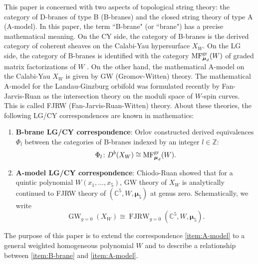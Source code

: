 \documentclass[11pt]{amsart}
\theoremstyle{definition} %
\theoremstyle{remark} %
\newcommand{\CC}{\mathbb C}
\newcommand{\ZZ}{\mathbb Z}
\def\MFhom{\operatorname{{MF}}}
\def\GW{\operatorname{\text{GW}}}
\newcommand{\bmu}{\boldsymbol{\mu}}
\newcommand{\FJRW}{{\operatorname{FJRW}}}
\renewcommand{\GW}{{\operatorname{GW}}}
\begin{document}
This paper is concerned with two aspects 
of topological string theory: 
the category of D-branes of type B (B-branes) and 
the closed string theory of type A (A-model). 
In this paper, the term ``B-brane" (or ``brane") 
has a precise mathematical meaning. 
On the CY side, the category of B-branes 
is the derived category of coherent sheaves on 
the Calabi-Yau hypersurface $X_W$. 
On the LG side, the category of B-branes 
is identified with the category 
$\MFhom^{\rm gr}_{\bmu_d}(W)$ 
of graded matrix factorizations of $W$ 
\cite{Orlov:cat-sing,Walcher, Hori-Walcher:F-term}. 
On the other hand, the mathematical A-model 
on the Calabi-Yau $X_W$ is given by GW (Gromov-Witten) theory. 
The mathematical A-model for the Landau-Ginzburg orbifold 
was formulated recently by Fan-Jarvis-Ruan \cite{FJR1} 
as the intersection theory on the moduli space 
of $W$-spin curves. 
This is called FJRW (Fan-Jarvis-Ruan-Witten) theory. 
About these theories, 
the following LG/CY correspondences  
are known in mathematics: 
\begin{enumerate} 
\item 
\label{item:B-brane} 
\textbf{B-brane LG/CY correspondence}: 
Orlov \cite{Orlov:equivalence} constructed derived equivalences 
$\Phi_l$ between the categories of B-branes 
indexed by an integer $l\in\ZZ$: 
\[
\Phi_l \colon D^b(X_W) \cong \MFhom^{\rm gr}_{\bmu_d}(W). 
\]

\item 
\label{item:A-model} 
\textbf{A-model LG/CY correspondence}:  
Chiodo-Ruan \cite{ChiRquintic} showed that 
for a quintic polynomial $W(x_1,\dots,x_5)$, 
GW theory of $X_W$ is analytically continued 
to FJRW theory of $(\CC^5, W,\bmu_5)$ at genus zero. 
Schematically, we write 
\[
\GW_{g=0}(X_W) \cong \FJRW_{g=0}(\CC^5,W,\bmu_5). 
\]
\end{enumerate} 
The purpose of this paper is to extend 
the correspondence \eqref{item:A-model} 
to a general weighted homogeneous polynomial $W$ 
and to describe a relationship between 
\eqref{item:B-brane} and \eqref{item:A-model}. 
\end{document}
